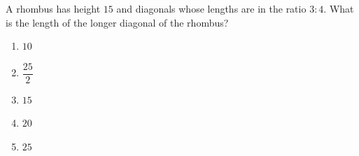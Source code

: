 A rhombus has height $15$ and diagonals whose lengths are in the ratio $3:4$. What is the length of the longer diagonal of the rhombus?
\begin{enumerate}
\item[(A)] $10$
\item[(B)] $\dfrac{25}{2}$
\item[(C)] $15$
\item[(D)] $20$
\item[(E)] $25$
\end{enumerate}
